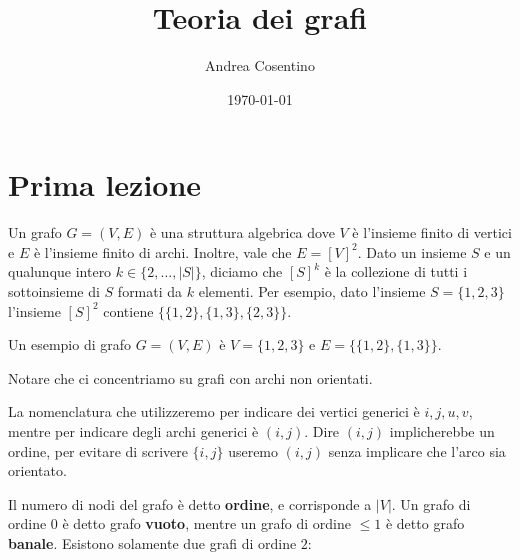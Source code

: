 \documentclass[12pt]{report}
\title{Teoria dei grafi}
\author{Andrea Cosentino}
\date{\today}
\begin{document}
\maketitle

\tableofcontents
\setlength{\columnsep}{0.8cm}
\setlength{\columnseprule}{0.2pt}

\chapter{Prima lezione}
\noindent
Un grafo $G = (V,E)$ è una struttura algebrica dove $V$ è l'insieme finito di vertici e $E$ è l'insieme finito di archi. Inoltre, vale che $E = [V]^2$. Dato un insieme $S$ e un qualunque intero $k \in \{2,\dots,|S|\}$, diciamo che $[S]^k$ è la collezione di tutti i sottoinsieme di $S$ formati da $k$ elementi. Per esempio, dato l'insieme $S = \{1,2,3\}$ l'insieme $[S]^2$ contiene $\{\{1,2\}, \{1,3\},\{2,3\}\}$. 

\begin{exmp}
    Un esempio di grafo $G = (V,E)$ è $V = \{1,2,3\}$ e $E = \{\{1,2\},\{1,3\}\}$.
    
\vspace{10px}
\begin{center}
\end{center}
\end{exmp}

\noindent
Notare che ci concentriamo su grafi con archi non orientati.

La nomenclatura che utilizzeremo per indicare dei vertici generici è $i,j,u,v$, mentre per indicare degli archi generici è $(i,j)$. Dire $(i,j)$ implicherebbe un ordine, per evitare di scrivere $\{i,j\}$ useremo $(i,j)$ senza implicare che l'arco sia orientato.

Il numero di nodi del grafo è detto \textbf{ordine}, e corrisponde a $|V|$. Un grafo di ordine $0$ è detto grafo \textbf{vuoto}, mentre un grafo di ordine $\leq 1$ è detto grafo \textbf{banale}. Esistono solamente due grafi di ordine $2$:

\end{document}
